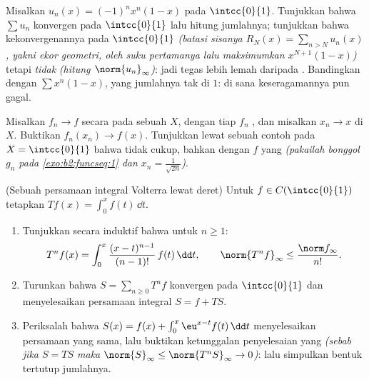 \begin{exercise}[$\star$]\label{exo:b2:funcseq:10}
Misalkan $u_n(x) = (-1)^n x^n(1 - x)$ pada $\intcc{0}{1}$. Tunjukkan
bahwa $\sum u_n$ konvergen  pada $\intcc{0}{1}$ lalu
hitung jumlahnya; tunjukkan bahwa kekonvergenannya  pada
$\intcc{0}{1}$ \emph{(batasi sisanya $R_N(x) = \sum_{n > N} u_n(x)$,
yakni ekor geometri, oleh suku pertamanya lalu maksimumkan
$x^{N+1}(1-x)$)} tetapi \emph{tidak}  \emph{(hitung
$\norm{u_n}_\infty$)}: jadi  tegas lebih lemah
daripada . Bandingkan dengan $\sum x^n(1-x)$, yang
jumlahnya tak  di $1$: di sana keseragamannya pun gagal.
\end{exercise}

\begin{exercise}[$\star\star$]\label{exo:b2:funcseq:11}
Misalkan $f_n \to f$ secara  pada sebuah  $X$, dengan
tiap $f_n$ , dan misalkan $x_n \to x$ di $X$. Buktikan $f_n(x_n)
\to f(x)$. Tunjukkan lewat sebuah contoh pada $X = \intcc{0}{1}$ bahwa
 tidak cukup, bahkan dengan $f$ yang
 \emph{(pakailah bonggol $g_n$ pada \cref{exo:b2:funcseq:1} dan
$x_n = \frac{1}{\sqrt{2n}}$)}.
\end{exercise}

\begin{exercise}[$\star\star\star$]\label{exo:b2:funcseq:12}
(Sebuah persamaan integral Volterra lewat deret) Untuk $f \in
C(\intcc{0}{1})$ tetapkan $Tf(x) = \int_0^x f(t)\,\dd t$.
\begin{enumerate}
  \item Tunjukkan secara induktif bahwa untuk $n \geq 1$:
        \[
        T^n f(x) = \int_0^x \frac{(x -
        t)^{n-1}}{(n-1)!}\,f(t)\,\dd t,
        \qquad
        \norm{T^n f}_\infty \leq \frac{\norm f_\infty}{n!} .
        \]
  \item Turunkan bahwa $S = \sum_{n\geq0} T^n f$ konvergen 
        pada $\intcc{0}{1}$ dan menyelesaikan persamaan integral $S = f
        + TS$.
  \item Periksalah bahwa $S(x) = f(x) + \int_0^x \eu^{x-t}f(t)\,\dd
        t$ menyelesaikan persamaan yang sama, lalu buktikan ketunggalan
        penyelesaian yang  \emph{(sebab jika $S = TS$ maka
        $\norm{S}_\infty \leq \norm{T^nS}_\infty \to 0$)}:
        lalu simpulkan bentuk tertutup jumlahnya.
\end{enumerate}
\end{exercise}

